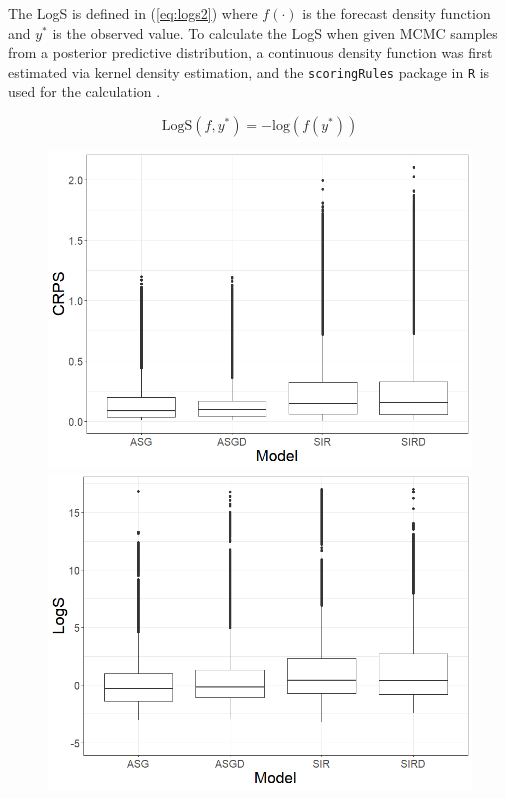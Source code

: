 \documentclass{article}
\begin{document}
The LogS is defined in (\ref{eq:logs2}) where $f(\cdot)$ is the forecast density function and $y^*$ is the observed value. To calculate the LogS when given MCMC samples from a posterior predictive distribution, a continuous density function was first estimated via kernel density estimation, and the \texttt{scoringRules} package in \texttt{R} is used for the calculation \cite[]{jordan2019scoring}.

\begin{equation}
    \text{LogS}(f, y^*) = -\text{log}(f(y^*))
    \label{eq:logs2}
\end{equation}


\begin{figure}[hbt!]
\centering
  \centering
  \includegraphics[scale=.3]{Images/overall_crps.png}
  \centering
  \includegraphics[scale=.3]{Images/overall_logs.png}

\end{figure}
\end{document}
